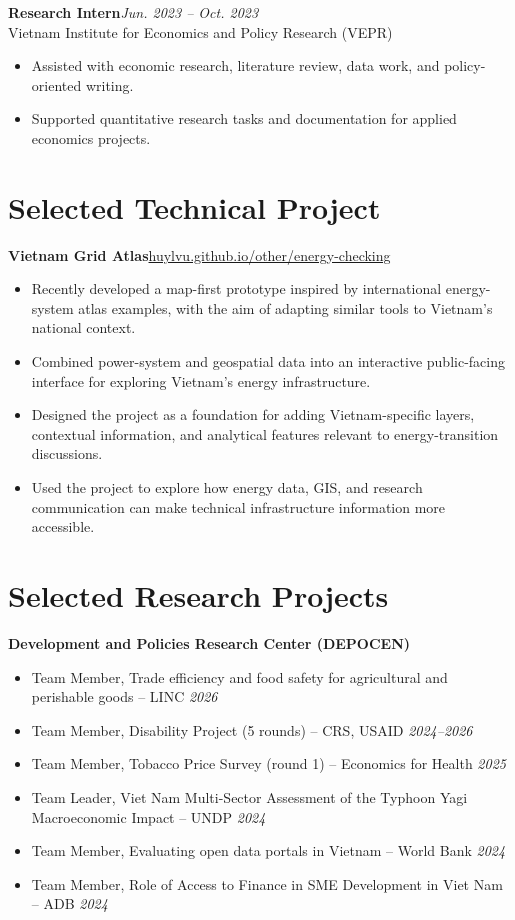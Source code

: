 \documentclass[10pt]{article}
\begin{document}
\textbf{Research Intern}\hfill\emph{Jun. 2023 -- Oct. 2023}\\
Vietnam Institute for Economics and Policy Research (VEPR)
\begin{itemize}
\item Assisted with economic research, literature review, data work, and policy-oriented writing.
\item Supported quantitative research tasks and documentation for applied economics projects.
\end{itemize}

\section{Selected Technical Project}
\textbf{Vietnam Grid Atlas}\hfill\href{https://huylvu.github.io/other/energy-checking}{huylvu.github.io/other/energy-checking}
\begin{itemize}
\item Recently developed a map-first prototype inspired by international energy-system atlas examples, with the aim of adapting similar tools to Vietnam's national context.
\item Combined power-system and geospatial data into an interactive public-facing interface for exploring Vietnam's energy infrastructure.
\item Designed the project as a foundation for adding Vietnam-specific layers, contextual information, and analytical features relevant to energy-transition discussions.
\item Used the project to explore how energy data, GIS, and research communication can make technical infrastructure information more accessible.
\end{itemize}

\section{Selected Research Projects}
\textbf{Development and Policies Research Center (DEPOCEN)}
\begin{itemize}
\item Team Member, Trade efficiency and food safety for agricultural and perishable goods -- LINC \hfill \emph{2026}
\item Team Member, Disability Project (5 rounds) -- CRS, USAID \hfill \emph{2024--2026}
\item Team Member, Tobacco Price Survey (round 1) -- Economics for Health \hfill \emph{2025}
\item Team Leader, Viet Nam Multi-Sector Assessment of the Typhoon Yagi Macroeconomic Impact -- UNDP \hfill \emph{2024}
\item Team Member, Evaluating open data portals in Vietnam -- World Bank \hfill \emph{2024}
\item Team Member, Role of Access to Finance in SME Development in Viet Nam -- ADB \hfill \emph{2024}
\end{itemize}
\end{document}
